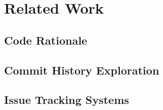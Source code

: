 \chapter{Related Work}
\label{ch:Related-Work}

\section{Code Rationale}
\label{sec:Code-Rationale}

\section{Commit History Exploration}
\label{sec:Commit-History-Expl}

\section{Issue Tracking Systems}
\label{sec:Issue-Tracking-Sys}

\endinput

Any text after an \endinput is ignored.
You could put scraps here or things in progress.